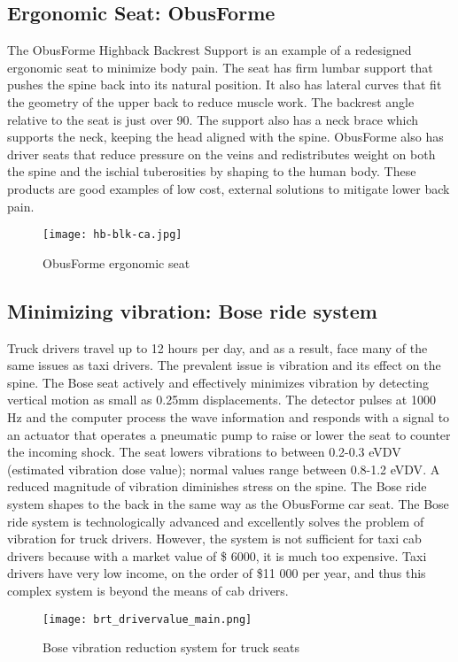 \documentclass[11pt]{article}
\begin{document}
\subsection{Ergonomic Seat: ObusForme}
The ObusForme Highback Backrest Support is an example of a redesigned ergonomic seat to minimize body pain. 
The seat has firm lumbar support that pushes the spine back into its natural position. 
It also has lateral curves that fit the geometry of the upper back to reduce muscle work\cite{ObusFormebackrest}. 
The backrest angle relative to the seat is just over 90\textdegree. The support also has a neck brace which supports
the neck, keeping the head aligned with the spine\cite{ObusFormedriverchair}.
ObusForme also has driver seats that reduce pressure on the veins and redistributes weight 
on both the spine and the ischial tuberosities by shaping to the human
body\cite{ObusFormecushion}. These products are good examples of low
cost, external solutions to mitigate lower back pain.
\begin{figure}[h]
  \centering
  \texttt{[image: hb-blk-ca.jpg]}
  \caption{ObusForme ergonomic seat}
\end{figure}
\subsection{Minimizing vibration: Bose ride system}
Truck drivers travel up to 12 hours per day, and as a result, face many of the same issues as taxi drivers. 
The prevalent issue is vibration and its effect on the spine. The Bose seat actively and effectively minimizes vibration 
by detecting vertical motion as small as 0.25mm displacements. %
The detector pulses at 1000 Hz and the computer process the 
wave information and responds with a signal to an actuator that operates a pneumatic pump to raise or lower the seat to 
counter the incoming shock. The seat lowers vibrations to between 0.2-0.3 eVDV (estimated vibration dose value); normal values range 
between 0.8-1.2 eVDV\cite{Bosetruckseat}. A reduced magnitude of
vibration diminishes stress on the spine. The Bose ride system shapes
to the back in the same way as the 
ObusForme car seat\cite{Bosetruckseat}. The Bose ride system is 
technologically advanced and excellently solves the problem of
vibration for truck drivers. However, the system is not sufficient for taxi cab
drivers because with a market value of \$ 6000\cite{Bosetruckseat}, it is much too expensive. Taxi drivers have very low
income, on the order of \$11 000 per year\cite{iTaxiWorkers2012}, and thus this complex
system is beyond the means of cab drivers.
\begin{figure}[h]
  \centering
  \texttt{[image: brt\_drivervalue\_main.png]}
  \caption{Bose vibration reduction system for truck seats}
\end{figure}
\end{document}
